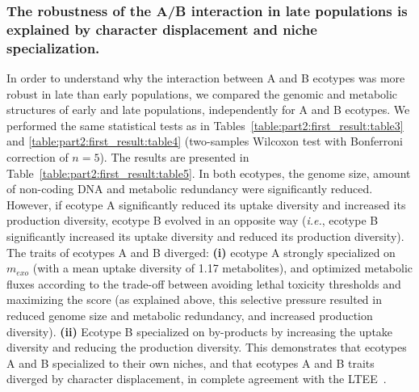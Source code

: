 
\subsubsection*{The robustness of the A/B interaction in late populations is explained by character displacement and niche specialization.}

In order to understand why the interaction between A and B ecotypes was more robust in late than early populations, we compared the genomic and metabolic structures of early and late populations, independently for A and B ecotypes. We performed the same statistical tests as in Tables~\ref{table:part2:first_result:table3} and \ref{table:part2:first_result:table4} (two-samples Wilcoxon test with Bonferroni correction of $n=5$). The results are presented in Table~\ref{table:part2:first_result:table5}. In both ecotypes, the genome size, amount of non-coding DNA and metabolic redundancy were significantly reduced. However, if ecotype A significantly reduced its uptake diversity and increased its production diversity, ecotype B evolved in an opposite way (\textit{i.e.}, ecotype B significantly increased its uptake diversity and reduced its production diversity).
The traits of ecotypes A and B diverged: \textbf{(i)} ecotype A strongly specialized on $m_{exo}$ (with a mean uptake diversity of 1.17 metabolites), and optimized metabolic fluxes according to the trade-off between avoiding lethal toxicity thresholds and maximizing the score (as explained above, this selective pressure resulted in reduced genome size and metabolic redundancy, and increased production diversity). \textbf{(ii)} Ecotype B specialized on by-products by increasing the uptake diversity and reducing the production diversity. This demonstrates that ecotypes A and B specialized to their own niches, and that ecotypes A and B traits diverged by character displacement, in complete agreement with the LTEE~\citep{legac-et-al-2012,grosskopf-et-al-2016}.

